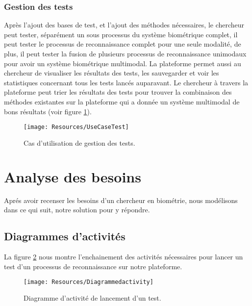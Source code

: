 \subsubsection{Gestion des tests}
Après l’ajout des bases de test, et l’ajout des méthodes nécessaires, le chercheur peut tester, séparément un sous processus du système biométrique complet, il peut tester le processus de reconnaissance complet pour une seule modalité, de plus, il peut tester la fusion de plusieurs processus de reconnaissance unimodaux pour avoir un système biométrique multimodal.
La plateforme permet aussi au chercheur de visualiser les résultats des tests, les sauvegarder et voir les statistiques concernant tous les tests lancés auparavant. Le chercheur à travers la plateforme peut trier les résultats des tests pour trouver la combinaison des méthodes existantes sur la plateforme qui a donnée un système multimodal de bons résultats (voir figure \ref{usecasetest}).


\begin{figure}[H]
	\centering
	\texttt{[image: Resources/UseCaseTest]}
	
	\caption{Cas d'utilisation de gestion des tests.}
	\label{usecasetest}
\end{figure}
\section{Analyse des besoins}
Aprés avoir recenser les besoins d'un chercheur en biométrie, nous modélisons dans ce qui suit, notre solution pour y répondre.

\subsection{Diagrammes d’activités } 
La figure \ref{activitydiagram} nous montre l’enchainement des activités nécessaires pour lancer un test d'un processus de reconnaissance sur notre plateforme.
\begin{landscape}
	
	\begin{figure}[H]
		\centering
		\texttt{[image: Resources/Diagrammedactivity]}
		
		\caption{Diagramme d'activité de lancement d'un test.}
		\label{activitydiagram}
	\end{figure}
\end{landscape}
\clearpage

